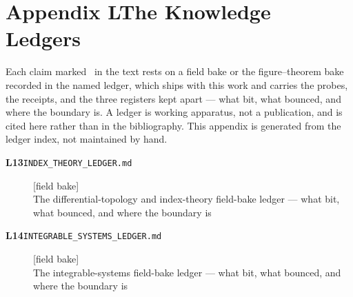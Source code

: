 \clearpage
\section*{Appendix L\quad The Knowledge Ledgers}\label{app:ledgers}
\small\noindent Each claim marked \ldgmarker\ in the text rests on a field bake or the figure--theorem bake recorded in the named ledger, which ships with this work and carries the probes, the receipts, and the three registers kept apart --- what bit, what bounced, and where the boundary is. A ledger is working apparatus, not a publication, and is cited here rather than in the bibliography. This appendix is generated from the ledger index, not maintained by hand.\par\medskip
\begingroup\renewcommand{\arraystretch}{1.25}
\begin{description}
\item[\textbf{L13}\quad\texttt{INDEX\_THEORY\_LEDGER.md}]\hfill\textsf{[field bake]}\\
The differential-topology and index-theory field-bake ledger --- what bit, what bounced, and where the boundary is
\item[\textbf{L14}\quad\texttt{INTEGRABLE\_SYSTEMS\_LEDGER.md}]\hfill\textsf{[field bake]}\\
The integrable-systems field-bake ledger --- what bit, what bounced, and where the boundary is
\end{description}
\endgroup
